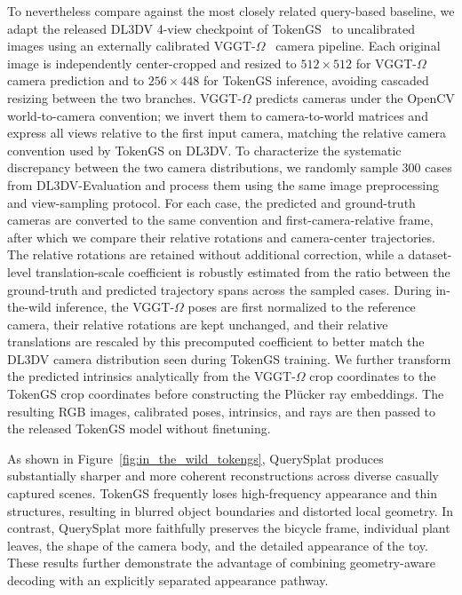 To nevertheless compare against the most closely related query-based baseline, we adapt the released DL3DV 4-view checkpoint of TokenGS~\cite{ren2026tokengs} to uncalibrated images using an externally calibrated VGGT-$\Omega$~\cite{wang2026vggtomega} camera pipeline. Each original image is independently center-cropped and resized to $512\times512$ for VGGT-$\Omega$ camera prediction and to $256\times448$ for TokenGS inference, avoiding cascaded resizing between the two branches. VGGT-$\Omega$ predicts cameras under the OpenCV world-to-camera convention; we invert them to camera-to-world matrices and express all views relative to the first input camera, matching the relative camera convention used by TokenGS on DL3DV. To characterize the systematic discrepancy between the two camera distributions, we randomly sample 300 cases from DL3DV-Evaluation and process them using the same image preprocessing and view-sampling protocol. For each case, the predicted and ground-truth cameras are converted to the same convention and first-camera-relative frame, after which we compare their relative rotations and camera-center trajectories. The relative rotations are retained without additional correction, while a dataset-level translation-scale coefficient is robustly estimated from the ratio between the ground-truth and predicted trajectory spans across the sampled cases. During in-the-wild inference, the VGGT-$\Omega$ poses are first normalized to the reference camera, their relative rotations are kept unchanged, and their relative translations are rescaled by this precomputed coefficient to better match the DL3DV camera distribution seen during TokenGS training. We further transform the predicted intrinsics analytically from the VGGT-$\Omega$ crop coordinates to the TokenGS crop coordinates before constructing the Pl\"ucker ray embeddings. The resulting RGB images, calibrated poses, intrinsics, and rays are then passed to the released TokenGS model without finetuning.

As shown in Figure~\ref{fig:in_the_wild_tokengs}, QuerySplat produces substantially sharper and more coherent reconstructions across diverse casually captured scenes. TokenGS frequently loses high-frequency appearance and thin structures, resulting in blurred object boundaries and distorted local geometry. In contrast, QuerySplat more faithfully preserves the bicycle frame, individual plant leaves, the shape of the camera body, and the detailed appearance of the toy. These results further demonstrate the advantage of combining geometry-aware decoding with an explicitly separated appearance pathway.















